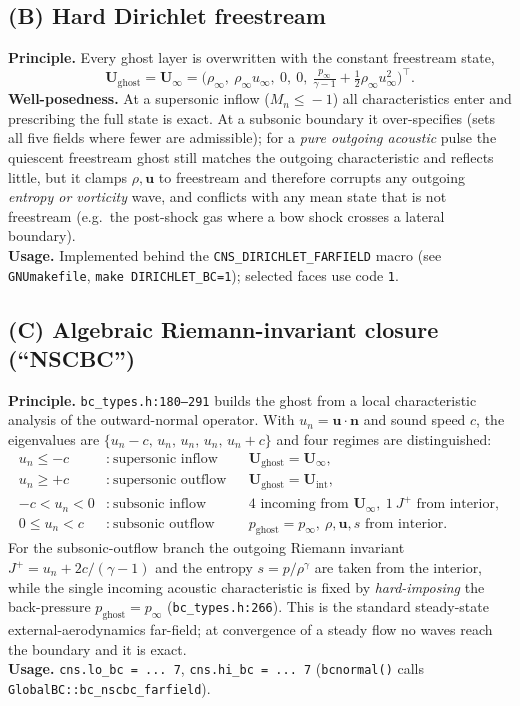 \documentclass[11pt]{article}
\newcommand{\Uvec}{\mathbf{U}}
\newcommand{\Uinf}{\mathbf{U}_\infty}
\newcommand{\rhoinf}{\rho_\infty}
\newcommand{\pinf}{p_\infty}
\newcommand{\uinf}{u_\infty}
\begin{document}
\subsection{(B) Hard Dirichlet freestream}
\textbf{Principle.} Every ghost layer is overwritten with the constant
freestream state,
\begin{equation}
\Uvec_{\text{ghost}} = \Uinf =
\big(\rhoinf,\ \rhoinf\uinf,\ 0,\ 0,\
\tfrac{\pinf}{\gamma-1}+\tfrac12\rhoinf\uinf^2\big)^\top .
\end{equation}
\textbf{Well-posedness.} At a supersonic inflow ($M_n\!\le\!-1$) all
characteristics enter and prescribing the full state is exact. At a subsonic
boundary it over-specifies (sets all five fields where fewer are admissible);
for a \emph{pure outgoing acoustic} pulse the quiescent freestream ghost still
matches the outgoing characteristic and reflects little, but it clamps
$\rho,\bm u$ to freestream and therefore corrupts any outgoing
\emph{entropy or vorticity} wave, and conflicts with any mean state that is not
freestream (e.g.\ the post-shock gas where a bow shock crosses a lateral
boundary).\\
\textbf{Usage.} Implemented behind the \texttt{CNS\_DIRICHLET\_FARFIELD} macro
(see \texttt{GNUmakefile}, \texttt{make DIRICHLET\_BC=1}); selected faces use
code \texttt{1}.

\subsection{(C) Algebraic Riemann-invariant closure (``NSCBC'')}
\textbf{Principle.} \texttt{bc\_types.h:180--291} builds the ghost from a local
characteristic analysis of the outward-normal operator. With
$u_n=\bm u\!\cdot\!\bm n$ and sound speed $c$, the eigenvalues are
$\{u_n-c,\,u_n,\,u_n,\,u_n,\,u_n+c\}$ and four regimes are distinguished:
\begin{align}
u_n\le -c &:\ \text{supersonic inflow} && \Uvec_{\text{ghost}}=\Uinf,\\
u_n\ge +c &:\ \text{supersonic outflow} && \Uvec_{\text{ghost}}=\Uvec_{\text{int}},\\
-c<u_n<0 &:\ \text{subsonic inflow} && \text{4 incoming from }\Uinf,\ 1\ J^+\text{ from interior},\\
0\le u_n<c &:\ \text{subsonic outflow} && \boxed{p_{\text{ghost}}=\pinf},\ \rho,\bm u,s\text{ from interior}.
\end{align}
For the subsonic-outflow branch the outgoing Riemann invariant
$J^+\!=\!u_n+2c/(\gamma\!-\!1)$ and the entropy $s=p/\rho^\gamma$ are taken from
the interior, while the single incoming acoustic characteristic is fixed by
\emph{hard-imposing} the back-pressure $p_{\text{ghost}}=\pinf$
(\texttt{bc\_types.h:266}). This is the standard steady-state external-aerodynamics
far-field; at convergence of a steady flow no waves reach the boundary and it is
exact.\\
\textbf{Usage.} \lstinline|cns.lo_bc = ... 7|, \lstinline|cns.hi_bc = ... 7|
(\texttt{bcnormal()} calls \texttt{GlobalBC::bc\_nscbc\_farfield}).
\end{document}
